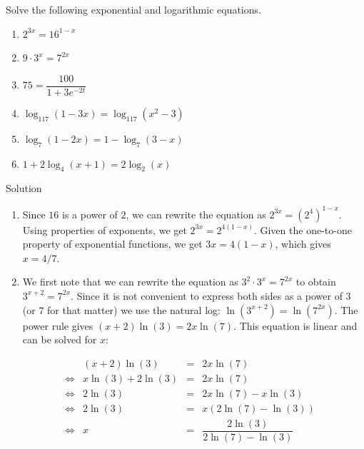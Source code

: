 \begin{example}  \label{expeqnsex1} Solve the following exponential and logarithmic equations.  

\begin{multicols}{2}
\begin{enumerate}

\item  $2^{3x} = 16^{1-x}$

\item  $9 \cdot 3^{x} = 7^{2x}$

\item  $75 = \dfrac{100}{1 + 3e^{-2t}}$

 \item $\log_{117}(1-3x) = \log_{117}\left(x^2-3\right)$

\item  $\log_{7}(1-2x) = 1 - \log_{7}(3-x)$

\item  $1 + 2 \log_{4}(x+1) = 2 \log_{2}(x)$

\end{enumerate}
\end{multicols}

Solution 
\begin{enumerate}

\item  Since $16$ is a power of $2$, we can rewrite the equation as $2^{3x} = \left(2^4\right)^{1-x}$.  Using properties of exponents, we get $2^{3x} = 2^{4(1-x)}$.  Given the one-to-one property of exponential functions, we get $3x = 4(1-x)$, which gives $x=4/7$.


\item  We first note that we can rewrite the equation as $3^2 \cdot 3^x = 7^{2x}$ to obtain $3^{x+2} = 7^{2x}$.  Since it is not convenient to express both sides as a power of $3$ (or $7$ for that matter) we use the natural log:  $\ln\left(3^{x+2}\right) = \ln\left(7^{2x}\right)$.  The power rule gives $(x+2) \ln(3) = 2x \ln(7)$. This equation  is linear and can be solved for $x$:

\[ \begin{array}{rrclr}
&(x+2) \ln(3) & = & 2x \ln(7) & \\

\Leftrightarrow&x \ln(3) + 2 \ln(3) & = & 2x \ln(7) & \\
\Leftrightarrow&2 \ln(3) & = & 2x \ln(7) - x \ln(3) & \\
\Leftrightarrow&2 \ln(3) & = & x (2 \ln(7) - \ln(3)) &\\
\Leftrightarrow&x & = & \dfrac{2 \ln(3)}{2\ln(7) - \ln(3)} & \\ [4pt]
\end{array}\]



\end{enumerate}
\end{example}
